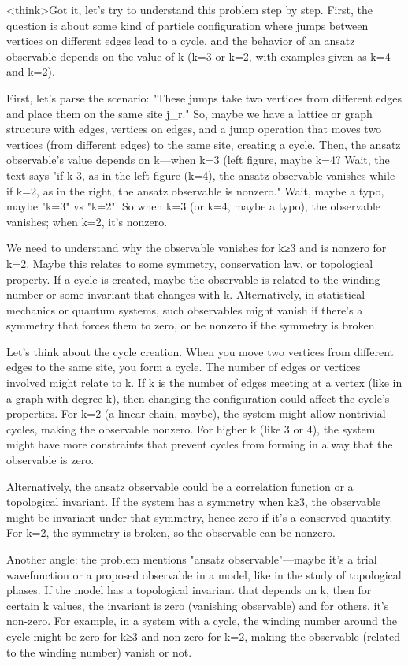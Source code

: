 <think>Got it, let's try to understand this problem step by step. First, the question is about some kind of particle configuration where jumps between vertices on different edges lead to a cycle, and the behavior of an ansatz observable depends on the value of k (k=3 or k=2, with examples given as k=4 and k=2). 

First, let's parse the scenario: "These jumps take two vertices from different edges and place them on the same site j_r." So, maybe we have a lattice or graph structure with edges, vertices on edges, and a jump operation that moves two vertices (from different edges) to the same site, creating a cycle. Then, the ansatz observable's value depends on k—when k=3 (left figure, maybe k=4? Wait, the text says "if k 3, as in the left figure (k=4), the ansatz observable vanishes while if k=2, as in the right, the ansatz observable is nonzero." Wait, maybe a typo, maybe "k=3" vs "k=2". So when k=3 (or k=4, maybe a typo), the observable vanishes; when k=2, it's nonzero.

We need to understand why the observable vanishes for k≥3 and is nonzero for k=2. Maybe this relates to some symmetry, conservation law, or topological property. If a cycle is created, maybe the observable is related to the winding number or some invariant that changes with k. Alternatively, in statistical mechanics or quantum systems, such observables might vanish if there's a symmetry that forces them to zero, or be nonzero if the symmetry is broken.

Let's think about the cycle creation. When you move two vertices from different edges to the same site, you form a cycle. The number of edges or vertices involved might relate to k. If k is the number of edges meeting at a vertex (like in a graph with degree k), then changing the configuration could affect the cycle's properties. For k=2 (a linear chain, maybe), the system might allow nontrivial cycles, making the observable nonzero. For higher k (like 3 or 4), the system might have more constraints that prevent cycles from forming in a way that the observable is zero.

Alternatively, the ansatz observable could be a correlation function or a topological invariant. If the system has a symmetry when k≥3, the observable might be invariant under that symmetry, hence zero if it's a conserved quantity. For k=2, the symmetry is broken, so the observable can be nonzero. 

Another angle: the problem mentions "ansatz observable"—maybe it's a trial wavefunction or a proposed observable in a model, like in the study of topological phases. If the model has a topological invariant that depends on k, then for certain k values, the invariant is zero (vanishing observable) and for others, it's non-zero. For example, in a system with a cycle, the winding number around the cycle might be zero for k≥3 and non-zero for k=2, making the observable (related to the winding number) vanish or not.

